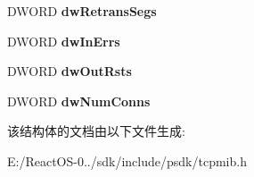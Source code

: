 \begin{DoxyCompactItemize}
D\+W\+O\+RD {\bfseries dw\+Retrans\+Segs}
\item 
\mbox{\label{struct___m_i_b___t_c_p_s_t_a_t_s_a429a5fa789628ac51c8c96decb1f1f0a}} 
D\+W\+O\+RD {\bfseries dw\+In\+Errs}
\item 
\mbox{\label{struct___m_i_b___t_c_p_s_t_a_t_s_abf46e2afc4f5314afe2325bff310e13e}} 
D\+W\+O\+RD {\bfseries dw\+Out\+Rsts}
\item 
\mbox{\label{struct___m_i_b___t_c_p_s_t_a_t_s_aca597674dcaf7db244eb1be900fb86c3}} 
D\+W\+O\+RD {\bfseries dw\+Num\+Conns}
\end{DoxyCompactItemize}


该结构体的文档由以下文件生成\+:\begin{DoxyCompactItemize}
\item 
E\+:/\+React\+O\+S-\/0../sdk/include/psdk/tcpmib.\+h\end{DoxyCompactItemize}
